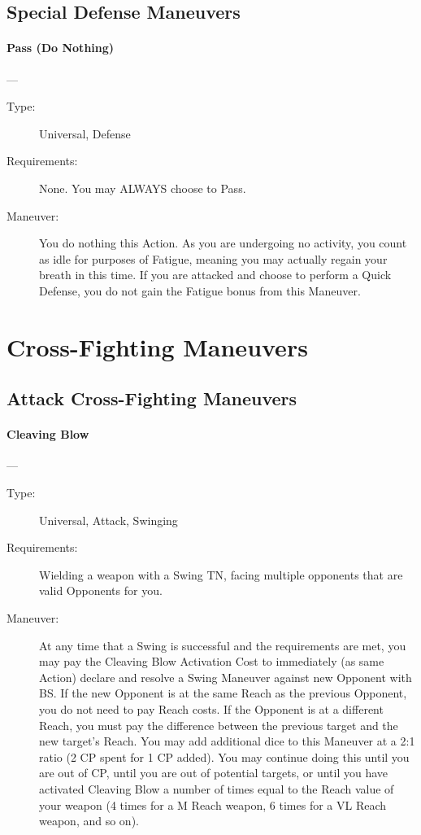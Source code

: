 \documentclass[oneside,11pt,english]{book}
\begin{document}
\subsection{Special Defense Maneuvers}
\paragraph{\large\label{man:Pass (Do Nothing)}Pass (Do Nothing)}---\quad{\large[None]}
\vspace{-10pt}\begin{description}
\item [Type:] Universal, Defense
\item [Requirements:] None. You may ALWAYS choose to Pass. 
\item [Maneuver:] You do nothing this Action. As you are undergoing no activity, you count as idle for purposes of Fatigue, meaning you may actually regain your breath in this time. If you are attacked and choose to perform a Quick Defense, you do not gain the Fatigue bonus from this Maneuver.
\end{description}
\section{Cross-Fighting Maneuvers}
\subsection{Attack Cross-Fighting Maneuvers}
\paragraph{\large\label{man:Cleaving Blow}Cleaving Blow}---\quad{\large[2]}
\vspace{-10pt}\begin{description} 
\item [Type:] Universal, Attack, Swinging 
\item [Requirements:] Wielding a weapon with a Swing TN, facing multiple opponents that are valid Opponents 
for you. 
\item [Maneuver:] At any time that a Swing is successful and the requirements are met, you may pay the 
Cleaving Blow Activation Cost to immediately (as same Action) declare and resolve a Swing Maneuver 
against new Opponent with BS. If the new Opponent is at the same Reach as the previous Opponent, you 
do not need to pay Reach costs. If the Opponent is at a different Reach, you must pay the difference 
between the previous target and the new target’s Reach. 
You may add additional dice to this Maneuver at a 2:1 ratio (2 CP spent for 1 CP added). You may 
continue doing this until you are out of CP, until you are out of potential targets, or until you have 
activated Cleaving Blow a number of times equal to the Reach value of your weapon (4 times for a M 
Reach weapon, 6 times for a VL Reach weapon, and so on). 
\end{description}
\end{document}
